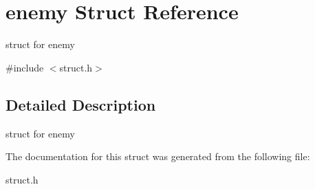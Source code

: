 \hypertarget{structenemy}{}\section{enemy Struct Reference}
\label{structenemy}


struct for enemy  




{\ttfamily \#include $<$struct.\+h$>$}



\subsection{Detailed Description}
struct for enemy 

The documentation for this struct was generated from the following file\+:\begin{DoxyCompactItemize}
\item 
struct.\+h\end{DoxyCompactItemize}
